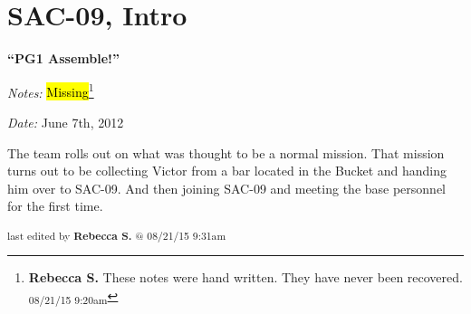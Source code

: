 \setcounter{chapter}{ 0 }
\chapter{\textbf{SAC-09, Intro} }




\begin{center}
 {\LARGE \textbf{``PG1 Assemble!''} } 
\end{center}




\textit{Notes:} \hl{Missing}\footnote{\textbf{Rebecca S. }These notes were hand written. They have never been recovered. \textsubscript{08/21/15 9:20am}}

\textit{Date:} June 7th, 2012



The team rolls out on what was thought to be a normal mission. That mission turns out to be collecting Victor from a bar located in the Bucket and handing him over to SAC-09. And then joining SAC-09 and meeting the base personnel for the first time.


\vspace{\fill}

\begin{flushright}
\textsubscript{last edited by \textbf{Rebecca S.} @ 08/21/15 9:31am}
\end{flushright}
